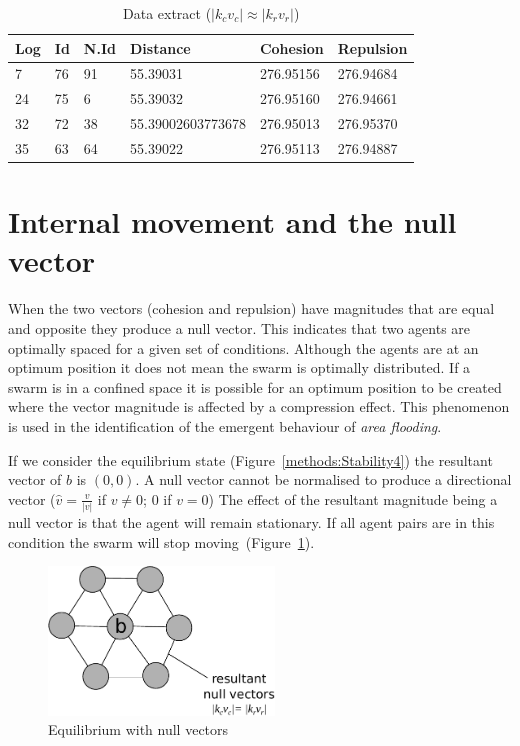 \documentclass[10pt,journal,letterpaper,twoside]{IEEEtran}
\begin{document}
\begin{table}[H]
\begin{center}
\begin{tabular}{| l | l | l | l | l | l |}
\hline
Log &	Id &	N.Id &	Distance &	{\color{green}Cohesion} &	{\color{red}Repulsion} 	\\ \hline
7 & 76 &	91 & 55.39031 & {\color{green}276.95156} & {\color{red}276.94684} \\ \hline
24 & 75 & 6 & 55.39032 & {\color{green}276.95160} & {\color{red}276.94661} \\ \hline
32 & 72 & 38 &	55.39002603773678 & {\color{green}276.95013} & {\color{red}276.95370} \\ \hline
35 &	63 & 64 & 55.39022 &	{\color{green}276.95113} &	{\color{red}276.94887} \\
\hline
\end{tabular}\caption{Data extract ($|k_cv_c| \approx |k_rv_r|$)} \label{tab:SampleEquilibrium}
\end{center}
\end{table}

\section{Internal movement and the null vector}\label{metric:StabilityNullVector}
When the two vectors (cohesion and repulsion) have magnitudes that are equal and opposite they produce a null vector. This indicates that two agents are optimally spaced for a given set of conditions. Although the agents are at an optimum position it does not mean the swarm is optimally distributed. If a swarm is in a confined space it is possible for an optimum position to be created where the vector magnitude is affected by a compression effect. This phenomenon is used in the identification of the emergent behaviour of \textit{area flooding}.  

If we consider the equilibrium state (Figure~\ref{methods:Stability4}) the resultant vector of $b$ is $(0,0)$. A null vector cannot be normalised to produce a directional vector ($\hat{v} = \frac{v}{|v|}$ if $v\neq0$; $0$ if $v=0$) The effect of the resultant magnitude being a null vector is that the agent will remain stationary. If all agent pairs are in this condition the swarm will stop moving~(Figure~\ref{methods:StabilityNullVector}).

\begin{figure}[H]
\begin{center}
\includegraphics[width=6cm]{figures/StabilityNullVector}
\end{center}
\caption{Equilibrium with null vectors} \label{methods:StabilityNullVector}
\end{figure}
\end{document}
